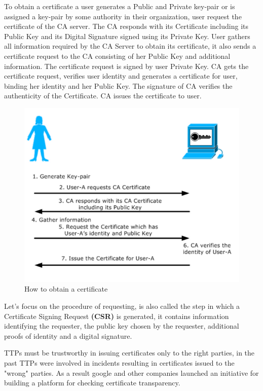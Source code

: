     To obtain a certificate a user generates a Public and Private key-pair or is assigned a key-pair by some authority in their organization, user request the certificate of the CA server. The CA responds with its Certificate including its Public Key and its Digital Signature signed using its Private Key. User gathers all information required by the CA Server to obtain its certificate, it also sends a certificate request to the CA consisting of her Public Key and additional information. The certificate request is signed by user Private Key. CA gets the certificate request, verifies user identity and generates a certificate for user, binding her identity and her Public Key. The signature of CA verifies the authenticity of the Certificate. CA issues the certificate to user.
    \begin{figure}[h!]
        \centering
        \includegraphics[scale=0.3]{images/obtaincertificate.png}
        \caption{How to obtain a certificate}
        \label{fig:obtainingc}
    \end{figure}
    
    \FloatBarrier
    
    Let's focus on the procedure of requesting, is also called the step in which a Certificate Signing Request \textbf{(CSR)} is generated, it contains information identifying the requester, the public key chosen by the requester, additional proofs of identity and a digital signature.

    TTPs must be trustworthy in issuing certificates only to the right parties, in the past TTPs were involved in incidents resulting in certificates issued to the "wrong" parties. As a result google and other companies launched an initiative for building a platform for checking certificate transparency.

